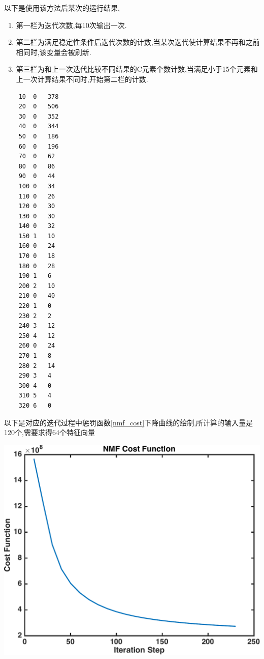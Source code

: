 以下是使用该方法后某次的运行结果,
\begin{enumerate}
	\item 第一栏为迭代次数,每10次输出一次.
	\item 第二栏为满足稳定性条件后迭代次数的计数,当某次迭代使计算结果不再和之前相同时,该变量会被刷新.
	\item 第三栏为和上一次迭代比较不同结果的C元素个数计数,当满足小于15个元素和上一次计算结果不同时,开始第二栏的计数.
\end{enumerate}

\begin{multicols}{4}
\begin{verbatim}
	10	0	378
	20	0	506
	30	0	352
	40	0	344
	50	0	186
	60	0	196
	70	0	62
	80	0	86
	90	0	44
	100	0	34
	110	0	26
	120	0	30
	130	0	30
	140	0	32
	150	1	10
	160	0	24
	170	0	18
	180	0	28
	190	1	6
	200	2	10
	210	0	40
	220	1	0
	230	2	2
	240	3	12
	250	4	12
	260	0	24
	270	1	8
	280	2	14
	290	3	4
	300	4	0
	310	5	4
	320	6	0
	\end{verbatim}
\end{multicols}
以下是对应的迭代过程中惩罚函数\ref{nmf_cost}下降曲线的绘制,所计算的输入量是120个,需要求得64个特征向量
\begin{center}
\begin{minipage}[t]{\linewidth}
\center
{
\includegraphics[width=\MyFactor\textwidth]{Img/nmf_cost.pdf} 
}
\end{minipage}
\medskip
\end{center}

